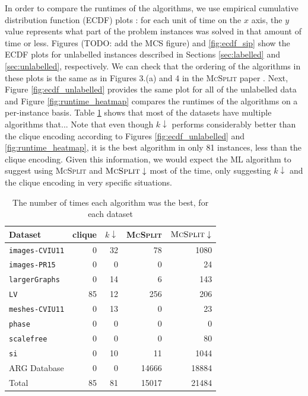 \documentclass{l4proj}
\theoremstyle{definition}
\theoremstyle{remark}
\begin{document}
In order to compare the runtimes of the algorithms, we use empirical cumulative
distribution function (ECDF) plots \cite{10.2307/2334448}: for each unit of time
on the $x$ axis, the $y$ value represents what part of the problem instances
was solved in that amount of time or less. Figures (TODO: add the MCS figure)
and \ref{fig:ecdf_sip} show the ECDF plots for unlabelled instances described in
Sections \ref{sec:labelled} and \ref{sec:unlabelled}, respectively. We can check
that the ordering of the algorithms in these plots is the same as in Figures
3.(a) and 4 in the \textsc{McSplit} paper \cite{DBLP:conf/ijcai/McCreeshPT17}.
Next, Figure \ref{fig:ecdf_unlabelled} provides the same plot for all of the
unlabelled data and Figure \ref{fig:runtime_heatmap} compares the runtimes of
the algorithms on a per-instance basis. Table \ref{table:best} shows that most
of the datasets have multiple algorithms that... Note that even though
$k\downarrow$ performs considerably better than the clique encoding according to
Figures \ref{fig:ecdf_unlabelled} and \ref{fig:runtime_heatmap}, it is the best
algorithm in only 81 instances, less than the clique encoding. Given this
information, we would expect the ML algorithm to suggest using \textsc{McSplit}
and $\textsc{McSplit}\downarrow$ most of the time, only suggesting $k\downarrow$
and the clique encoding in very specific situations.

\begin{table} %
  \centering
  \begin{tabular}{l r r r r}
    Dataset & clique & $k\downarrow$ & \textsc{McSplit} & $\textsc{McSplit}\downarrow$ \\
    \hline
    \texttt{images-CVIU11} & 0 & 32 & 78 & 1080 \\
    \texttt{images-PR15} & 0 & 0 & 0 & 24 \\
    \texttt{largerGraphs} & 0 & 14 & 6 & 143 \\
    \texttt{LV} & 85 & 12 & 256 & 206 \\
    \texttt{meshes-CVIU11} & 0 & 13 & 0 & 23 \\
    \texttt{phase} & 0 & 0 & 0 & 0 \\
    \texttt{scalefree} & 0 & 0 & 0 & 80 \\
    \texttt{si} & 0 & 10 & 11 & 1044 \\
    ARG Database & 0 & 0 & 14666 & 18884 \\
    \hline
    Total & 85 & 81 & 15017 & 21484
  \end{tabular}
  \caption{The number of times each algorithm was the best, for each dataset}
  \label{table:best}
\end{table}
\end{document}
